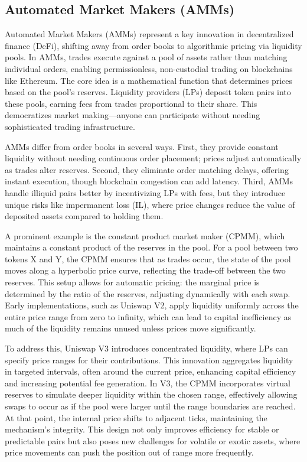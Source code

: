 \documentclass{article}
\begin{document}
\subsection{Automated Market Makers (AMMs)}

Automated Market Makers (AMMs) represent a key innovation in decentralized finance (DeFi), shifting away from order books to algorithmic pricing via liquidity pools. In AMMs, trades execute against a pool of assets rather than matching individual orders, enabling permissionless, non-custodial trading on blockchains like Ethereum. The core idea is a mathematical function that determines prices based on the pool’s reserves. Liquidity providers (LPs) deposit token pairs into these pools, earning fees from trades proportional to their share. This democratizes market making—anyone can participate without needing sophisticated trading infrastructure. 

AMMs differ from order books in several ways. First, they provide constant liquidity without needing continuous order placement; prices adjust automatically as trades alter reserves. Second, they eliminate order matching delays, offering instant execution, though blockchain congestion can add latency. Third, AMMs handle illiquid pairs better by incentivizing LPs with fees, but they introduce unique risks like impermanent loss (IL), where price changes reduce the value of deposited assets compared to holding them. 

A prominent example is the constant product market maker (CPMM), which maintains a constant product of the reserves in the pool. For a pool between two tokens X and Y, the CPMM ensures that as trades occur, the state of the pool moves along a hyperbolic price curve, reflecting the trade-off between the two reserves. This setup allows for automatic pricing: the marginal price is determined by the ratio of the reserves, adjusting dynamically with each swap. Early implementations, such as Uniswap V2, apply liquidity uniformly across the entire price range from zero to infinity, which can lead to capital inefficiency as much of the liquidity remains unused unless prices move significantly.

To address this, Uniswap V3 introduces concentrated liquidity, where LPs can specify price ranges for their contributions. This innovation aggregates liquidity in targeted intervals, often around the current price, enhancing capital efficiency and increasing potential fee generation. In V3, the CPMM incorporates virtual reserves to simulate deeper liquidity within the chosen range, effectively allowing swaps to occur as if the pool were larger until the range boundaries are reached. At that point, the internal price shifts to adjacent ticks, maintaining the mechanism's integrity. This design not only improves efficiency for stable or predictable pairs but also poses new challenges for volatile or exotic assets, where price movements can push the position out of range more frequently.
\end{document}
